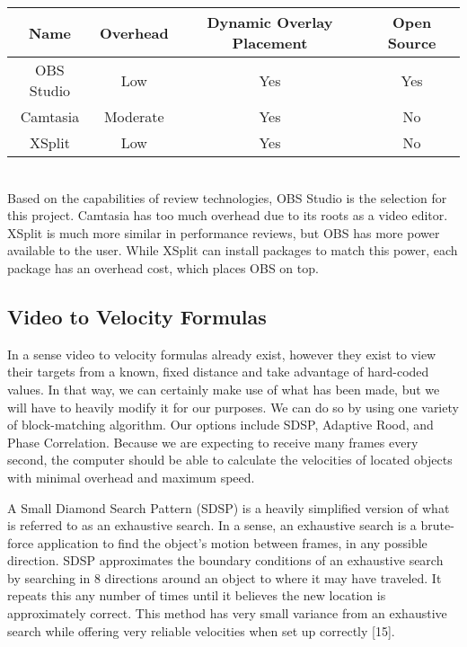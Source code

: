 \documentclass[letterpaper,10pt,onecolumn,draftclsnofoot]{IEEEtran}
\begin{document}
\begin{tabular}{|c|c|c|c|}
  \hline
  \textbf{Name} & \textbf{Overhead} & \textbf{Dynamic Overlay Placement} & \textbf{Open Source} \\
  \hline
  OBS Studio & Low & Yes & Yes \\ 
  \hline
  Camtasia & Moderate & Yes & No  \\ 
  \hline
  XSplit & Low & Yes & No \\ 
  \hline
\end{tabular} \\

Based on the capabilities of review technologies, OBS Studio is the selection for this project.  Camtasia has too much overhead due to its roots as a video editor.  XSplit is much more similar in performance reviews, but OBS has more power available to the user.  While XSplit can install packages to match this power, each package has an overhead cost, which places OBS on top.

\newpage
\subsection{Video to Velocity Formulas} %

In a sense video to velocity formulas already exist, however they exist to view their targets from a known, fixed distance and take advantage of hard-coded values.  In that way, we can certainly make use of what has been made, but we will have to heavily modify it for our purposes.  We can do so by using one variety of block-matching algorithm.  Our options include SDSP, Adaptive Rood, and Phase Correlation.  Because we are expecting to receive many frames every second, the computer should be able to calculate the velocities of located objects with minimal overhead and maximum speed.

A Small Diamond Search Pattern (SDSP) is a heavily simplified version of what is referred to as an exhaustive search.  In a sense, an exhaustive search is a brute-force application to find the object's motion between frames, in any possible direction.  SDSP approximates the boundary conditions of an exhaustive search by searching in 8 directions around an object to where it may have traveled.  It repeats this any number of times until it believes the new location is approximately correct.  This method has very small variance from an exhaustive search while offering very reliable velocities when set up correctly [15].
\end{document}
